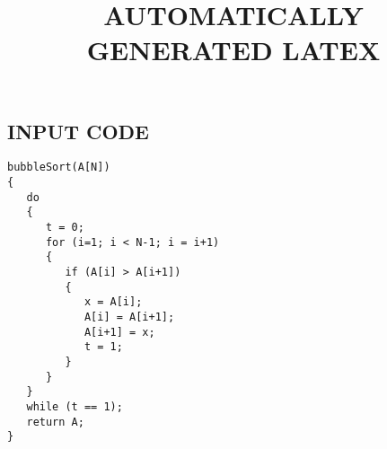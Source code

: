 \documentclass{article}
\begin{document}
\title{AUTOMATICALLY GENERATED LATEX}
\maketitle

\subsection{INPUT CODE}
\begin{lstlisting}
bubbleSort(A[N])
{
   do
   {
      t = 0;
      for (i=1; i < N-1; i = i+1)
      {
         if (A[i] > A[i+1])
         {
            x = A[i];
            A[i] = A[i+1];
            A[i+1] = x;
            t = 1;
         }
      }
   }
   while (t == 1);
   return A;
}

\end{lstlisting}
\end{document}
